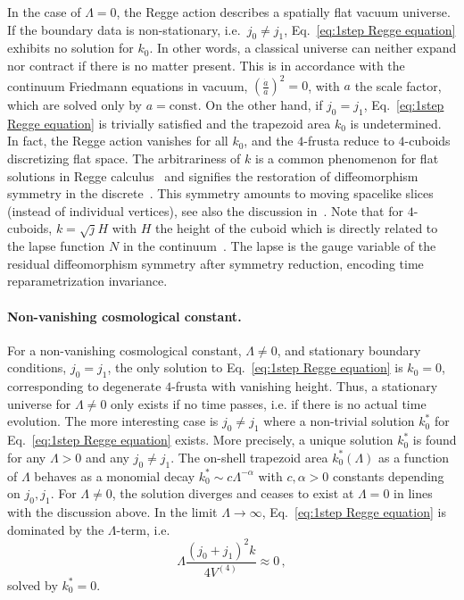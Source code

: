\documentclass[amsmath,amssymb,aps,twocolumn,superscriptaddress,nofootinbib]{revtex4-1}
\begin{document}
In the case of $\Lambda = 0$, the Regge action describes a spatially flat vacuum universe. 
If the boundary data is non-stationary, i.e.~$j_0 \neq j_1$, Eq.~\eqref{eq:1step Regge equation} exhibits no solution for $k_0$. 
In other words, a classical universe can neither expand nor contract if there is no matter present. 
This is in accordance with the continuum Friedmann equations in vacuum, $\left(\frac{\dot{a}}{a}\right)^2 = 0$, with $a$ the scale factor, which are solved only by $a = \mathrm{const}$.
On the other hand, if $j_0 = j_1$, Eq.~\eqref{eq:1step Regge equation}  is trivially satisfied and the trapezoid area $k_0$ is undetermined.
In fact, the Regge action vanishes for all $k_0$, and the $4$-frusta reduce to $4$-cuboids discretizing flat space. 
The arbitrariness of $k$ is a common phenomenon for flat solutions in Regge calculus~\cite{Rocek:1981ama,Rocek:1982tj} and signifies the restoration of diffeomorphism symmetry in the discrete~\cite{Dittrich:2008pw,Bahr:2009qc}.
This symmetry amounts to moving spacelike slices (instead of individual vertices), see also the discussion in~\cite{Bahr:2015gxa}.
Note that for $4$-cuboids, $k = \sqrt{j}H$ with $H$ the height of the cuboid which is directly related to the lapse function $N$ in the continuum~\cite{Dittrich:2021gww,Jercher:2023csk}.
The lapse is the gauge variable of the residual diffeomorphism symmetry after symmetry reduction, encoding time reparametrization invariance. 

\paragraph*{Non-vanishing cosmological constant.}

For a non-vanishing cosmological constant, $\Lambda \neq 0$, and stationary boundary conditions, $j_0 = j_1$, the only solution to Eq.~\eqref{eq:1step Regge equation} is $k_0 = 0$, corresponding to degenerate $4$-frusta with vanishing height.
Thus, a stationary universe for $\Lambda\neq 0$ only exists if no time passes, i.e. if there is no actual time evolution. 
The more interesting case is $j_0 \neq j_1$ where a non-trivial solution $k_0^*$ for Eq.~\eqref{eq:1step Regge equation} exists. 
More precisely, a unique solution $k_0^*$ is found for any $\Lambda > 0$ and any $j_0\neq j_1$. 
The on-shell trapezoid area $k_0^*(\Lambda)$ as a function of $\Lambda$ behaves as a monomial decay $k_0^*\sim c\Lambda^{-\alpha}$ with $c,\alpha > 0$ constants depending on $j_0, j_1$. 
For $\Lambda \neq 0$, the solution diverges and ceases to exist at $\Lambda = 0$ in lines with the discussion above.
In the limit $\Lambda\rightarrow\infty$, Eq.~\eqref{eq:1step Regge equation} is dominated by the $\Lambda$-term, i.e.
%
\begin{equation}
\Lambda \frac{(j_0 + j_1)^2k}{4 V^{(4)}} \approx 0\,,
\end{equation}
%
solved by $k_0^* = 0$.
\end{document}
